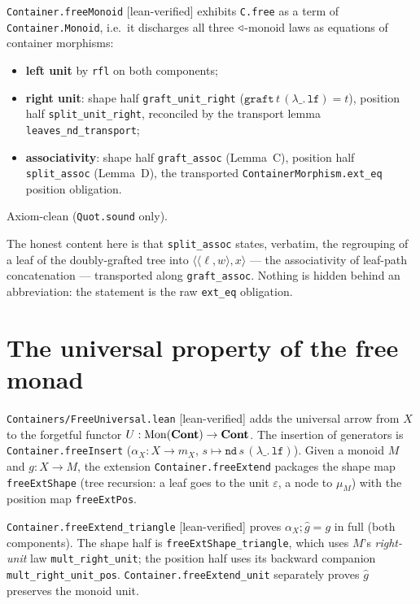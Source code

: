 \begin{theorem}
\label{thm:freeMonoid}
\texttt{Container.freeMonoid} [lean-verified] exhibits \texttt{C.free} as a term of \texttt{Container.Monoid}, i.e.\ it discharges all three $\triangleleft$-monoid laws as equations of container morphisms:
\begin{itemize}
  \item \textbf{left unit} by \texttt{rfl} on both components;
  \item \textbf{right unit}: shape half \texttt{graft\_unit\_right} ($\texttt{graft}\,t\,(\lambda\_.\,\texttt{lf})=t$), position half \texttt{split\_unit\_right}, reconciled by the transport lemma \texttt{leaves\_nd\_transport};
  \item \textbf{associativity}: shape half \texttt{graft\_assoc} (Lemma~C), position half \texttt{split\_assoc} (Lemma~D), the transported \texttt{ContainerMorphism.ext\_eq} position obligation.
\end{itemize}
Axiom-clean (\texttt{Quot.sound} only).
\end{theorem}

The honest content here is that \texttt{split\_assoc} states, verbatim, the regrouping of a leaf of the doubly-grafted tree into $\langle\langle\ell,w\rangle,x\rangle$ --- the associativity of leaf-path concatenation --- transported along \texttt{graft\_assoc}. Nothing is hidden behind an abbreviation: the statement is the raw \texttt{ext\_eq} obligation.

\section{The universal property of the free monad}
\label{sec:free-universal}

\texttt{Containers/FreeUniversal.lean} [lean-verified] adds the universal arrow from $X$ to the forgetful functor $U:\mathrm{Mon}(\mathbf{Cont})\to\mathbf{Cont}$. The insertion of generators is \texttt{Container.freeInsert} ($\alpha_X:X\to m_X$, $s\mapsto\texttt{nd}\,s\,(\lambda\_.\,\texttt{lf})$). Given a monoid $M$ and $g:X\to M$, the extension \texttt{Container.freeExtend} packages the shape map \texttt{freeExtShape} (tree recursion: a leaf goes to the unit $\varepsilon$, a node to $\mu_M$) with the position map \texttt{freeExtPos}.

\begin{theorem}
\label{thm:triangle}
\texttt{Container.freeExtend\_triangle} [lean-verified] proves $\alpha_X\mathbin{;}\hat g = g$ in full (both components). The shape half is \texttt{freeExtShape\_triangle}, which uses $M$'s \emph{right-unit} law \texttt{mult\_right\_unit}; the position half uses its backward companion \texttt{mult\_right\_unit\_pos}. \texttt{Container.freeExtend\_unit} separately proves $\hat g$ preserves the monoid unit.
\end{theorem}

